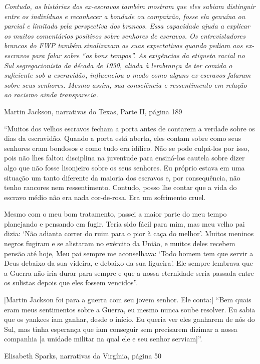 \emph{Contudo, as histórias dos ex-escravos também mostram que eles
sabiam distinguir entre os indivíduos e reconhecer a bondade ou
compaixão, fosse ela genuína ou parcial e limitada pela perspectiva dos
brancos. Essa capacidade ajuda a explicar os muitos comentários
positivos sobre senhores de escravos. Os entrevistadores brancos do FWP
também sinalizavam as suas expectativas quando pediam aos ex-escravos
para falar sobre ``os bons tempos''. As exigências da etiqueta racial no
Sul segregacionista da década de 1930, aliada à lembrança de ter comida
o suficiente sob a escravidão, influenciou o modo como alguns
ex-escravos falaram sobre seus senhores. Mesmo assim, sua consciência e
ressentimento em relação ao racismo ainda transparecia.}

Martin Jackson, narrativas do Texas, Parte II, página 189

``Muitos dos velhos escravos fecham a porta antes de contarem a verdade
sobre os dias da escravidão. Quando a porta está aberta, eles contam
sobre como seus senhores eram bondosos e como tudo era idílico. Não se
pode culpá-los por isso, pois não lhes faltou disciplina na juventude
para ensiná-los cautela sobre dizer algo que não fosse lisonjeiro sobre
os seus senhores. Eu próprio estava em uma situação um tanto diferente
da maioria dos escravos e, por consequência, não tenho rancores nem
ressentimento. Contudo, posso lhe contar que a vida do escravo médio não
era nada cor-de-rosa. Era um sofrimento cruel.

Mesmo com o meu bom tratamento, passei a maior parte do meu tempo
planejando e pensando em fugir. Teria sido fácil para mim, mas meu velho
pai dizia: `Não adianta correr do ruim para o pior à caça do melhor'.
Muitos meninos negros fugiram e se alistaram no exército da União, e
muitos deles recebem pensão até hoje, Meu pai sempre me aconselhava:
`Todo homem tem que servir a Deus debaixo da sua videira, e debaixo da
sua figueira'. Ele sempre lembrava que a Guerra não iria durar para
sempre e que a nossa eternidade seria passada entre os sulistas depois
que eles fossem vencidos''.

{[}Martin Jackson foi para a guerra com seu jovem senhor. Ele conta:{]}
``Bem quais eram meus sentimentos sobre a Guerra, eu mesmo nunca soube
resolver. Eu sabia que os yankees iam ganhar, desde o início. Eu queria
ver eles ganharem de nós do Sul, mas tinha esperança que iam conseguir
sem precisarem dizimar a nossa companhia {[}a unidade militar na qual
ele e seu senhor serviam{]}''.

Elisabeth Sparks, narrativas da Virgínia, página 50


